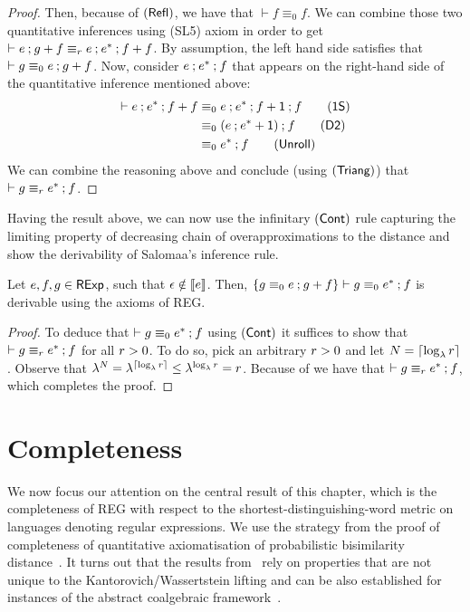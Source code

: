 \begin{proof}
		
		Then, because of $(\textsf{Refl})$, we have that $\vdash f \equiv_0 f$. We can combine those two quantitative inferences using \textsf{(SL5)} axiom in order to get $\vdash e \mathbin{;} g + f \equiv_{r} e \mathbin{;} e^\ast \mathbin{;} f  + f $. By assumption, the left hand side satisfies that $\vdash g \equiv_0 e \mathbin{;} g + f$. Now, consider $e \mathbin{;} e^\ast \mathbin{;} f$ that appears on the right-hand side of the quantitative inference mentioned above:
	\begin{align*}
		\vdash e \seq e^{\ast} \seq f + f &\equiv_0 e \seq e^\ast \seq f + \one \seq f \tag{\textsf{1S}} \\
		&\equiv_0 (e \seq e^* + \one) \seq f \tag{\textsf{D2}} \\
		&\equiv_0 e^{*} \seq f \tag{\textsf{Unroll}}
	\end{align*}
	We can combine the reasoning above and conclude (using $(\textsf{Triang})$) that $\vdash g \equiv_{r} e^\ast \mathbin{;} f$.
\end{proof}
Having the result above, we can now use the infinitary $(\textsf{Cont})$ rule capturing the limiting property of decreasing chain of overapproximations to the distance and show the derivability of Salomaa's inference rule.
\begin{lemma}
	Let $e,f,g \in \mathsf{RExp}$, such that $\epsilon \notin \left\llbracket{e}\right\rrbracket$. Then, $\{g \equiv_0 e \mathbin{;} g + f\} \vdash g \equiv_{0} e^{\ast} \mathbin{;} f$ is derivable using the axioms of \textsf{REG}.

\end{lemma}
\begin{proof}
To deduce that $\vdash g \equiv_0 e^{\ast} \mathbin{;} f$ using $(\textsf{Cont})$ it suffices to show that $\vdash g \equiv_{r} e^{\ast} \mathbin{;} f$ for all $r > 0$.  To do so, pick an arbitrary $r > 0$ and let $N = \lceil \log_{\lambda} r \rceil$. Observe that $\lambda^N = \lambda^{\lceil \log_{\lambda} r \rceil} \leq \lambda^{\log_{\lambda} r} = r$. Because of  we have that $\vdash g \equiv_{r} e^{\ast} \mathbin{;} f$, which completes the proof.
\end{proof}
\section{Completeness}\label{c2:sec:completeness}
We now focus our attention on the central result of this chapter, which is the completeness of \textsf{REG} with respect to the shortest-distinguishing-word metric on languages denoting regular expressions. We use the strategy from the proof of completeness of quantitative axiomatisation of probabilistic bisimilarity distance~\cite{Bacci:2018:Bisimilarity}. It turns out that the results from~\cite{Bacci:2018:Bisimilarity} rely on properties that are not unique to the Kantorovich/Wassertstein lifting and can be also established for instances of the abstract coalgebraic framework~\cite{Baldan:2018:Coalgebraic}.


